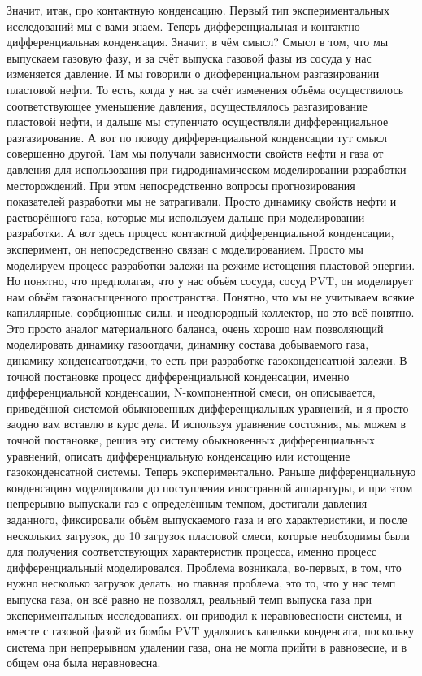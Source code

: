 \documentclass[main.tex]{subfiles}
\begin{document}
Значит, итак, про контактную конденсацию.
Первый тип экспериментальных исследований мы с вами знаем.
Теперь дифференциальная и контактно-дифференциальная конденсация.
Значит, в чём смысл?
Смысл в том, что мы выпускаем газовую фазу, и за счёт выпуска газовой фазы из сосуда у нас изменяется давление.
И мы говорили о дифференциальном разгазировании пластовой нефти.
То есть, когда у нас за счёт изменения объёма осуществилось соответствующее уменьшение давления, осуществлялось разгазирование пластовой нефти, и дальше мы ступенчато осуществляли дифференциальное разгазирование.
А вот по поводу дифференциальной конденсации тут смысл совершенно другой.
Там мы получали зависимости свойств нефти и газа от давления для использования при гидродинамическом моделировании разработки месторождений.
При этом непосредственно вопросы прогнозирования показателей разработки мы не затрагивали.
Просто динамику свойств нефти и растворённого газа, которые мы используем дальше при моделировании разработки.
А вот здесь процесс контактной дифференциальной конденсации, эксперимент, он непосредственно связан с моделированием.
Просто мы моделируем процесс разработки залежи на режиме истощения пластовой энергии.
Но понятно, что предполагая, что у нас объём сосуда, сосуд PVT, он моделирует нам объём газонасыщенного пространства.
Понятно, что мы не учитываем всякие капиллярные, сорбционные силы, и неоднородный коллектор, но это всё понятно.
Это просто аналог материального баланса, очень хорошо нам позволяющий моделировать динамику газоотдачи, динамику состава добываемого газа, динамику конденсатоотдачи, то есть при разработке газоконденсатной залежи.
В точной постановке процесс дифференциальной конденсации, именно дифференциальной конденсации, N-компонентной смеси, он описывается, приведённой системой обыкновенных дифференциальных уравнений, и я просто заодно вам вставлю в курс дела.
И используя уравнение состояния, мы можем в точной постановке, решив эту систему обыкновенных дифференциальных уравнений, описать дифференциальную конденсацию или истощение газоконденсатной системы.
Теперь экспериментально.
Раньше дифференциальную конденсацию моделировали до поступления иностранной аппаратуры, и при этом непрерывно выпускали газ с определённым темпом, достигали давления заданного, фиксировали объём выпускаемого газа и его характеристики, и после нескольких загрузок, до 10 загрузок пластовой смеси, которые необходимы были для получения соответствующих характеристик процесса, именно процесс дифференциальный моделировался.
Проблема возникала, во-первых, в том, что нужно несколько загрузок делать, но главная проблема, это то, что у нас темп выпуска газа, он всё равно не позволял, реальный темп выпуска газа при экспериментальных исследованиях, он приводил к неравновесности системы, и вместе с газовой фазой из бомбы PVT удалялись капельки конденсата, поскольку система при непрерывном удалении газа, она не могла прийти в равновесие, и в общем она была неравновесна.
\end{document}
